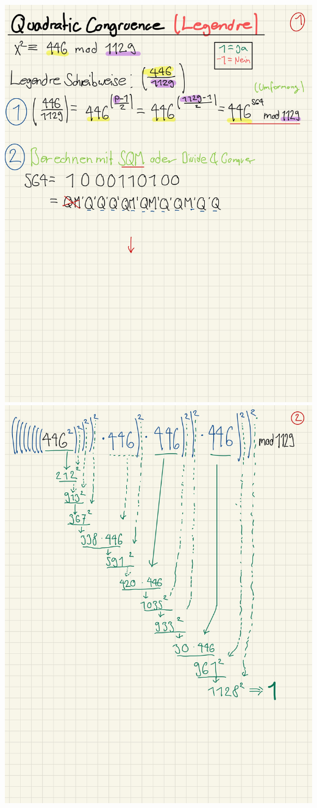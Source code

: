 \documentclass[11pt]{article}
\begin{document}
\begin{center}
	\includegraphics[scale=0.9]{img/legendre1.jpg}
	\includegraphics{img/legendre2.jpg}
\end{center}
    
\end{document}
